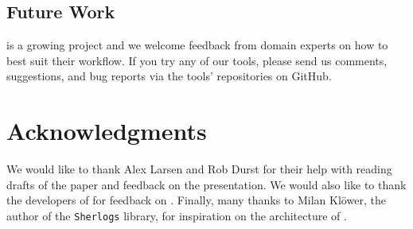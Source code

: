 \documentclass{juliacon}
\begin{document}
\subsection{Future Work}

\FlowFPX{} is a growing project and we welcome feedback from domain experts
on how to best suit their workflow.
If you try any of our tools, please send us comments, suggestions, and bug reports via the tools' repositories on GitHub.

\section{Acknowledgments}

We would like to thank Alex Larsen and Rob Durst for their help with reading drafts of the paper and feedback on the presentation.
We would also like to thank the developers of  for feedback on \FlowFPX{}.
Finally, many thanks to Milan Klöwer, the author of the \texttt{Sherlogs} library, for inspiration on the architecture of \FT{}.


\end{document}
